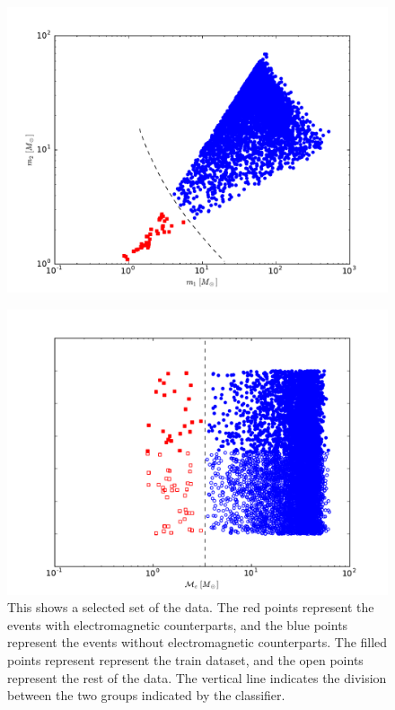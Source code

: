 \begin{figure}[ht]
  \includegraphics[width=\columnwidth]{img/output/mass-distribution}
  \caption{}
  \label{fig:2D}
\end{figure}

\begin{figure}[ht]
  \includegraphics[width=\columnwidth]{img/output/classifier_comparison}
  \caption{This shows a selected set of the data. The red points represent the events with electromagnetic counterparts, and the blue points represent the events without electromagnetic counterparts. The filled points represent represent the train dataset, and the open points represent the rest of the data. The vertical line indicates the division between the two groups indicated by the classifier.}
  \label{fig:class}
\end{figure}

